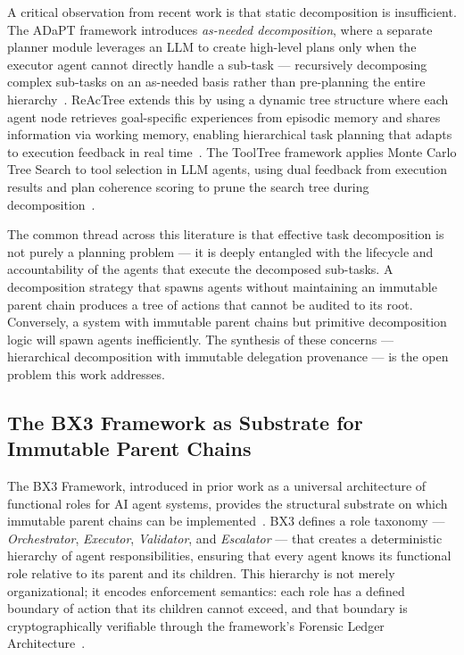 A critical observation from recent work is that static decomposition is insufficient. The ADaPT framework introduces \textit{as-needed decomposition}, where a separate planner module leverages an LLM to create high-level plans only when the executor agent cannot directly handle a sub-task — recursively decomposing complex sub-tasks on an as-needed basis rather than pre-planning the entire hierarchy~\cite{adapt-decomposition}. ReAcTree extends this by using a dynamic tree structure where each agent node retrieves goal-specific experiences from episodic memory and shares information via working memory, enabling hierarchical task planning that adapts to execution feedback in real time~\cite{reactree}. The ToolTree framework applies Monte Carlo Tree Search to tool selection in LLM agents, using dual feedback from execution results and plan coherence scoring to prune the search tree during decomposition~\cite{tool-tree}.

The common thread across this literature is that effective task decomposition is not purely a planning problem — it is deeply entangled with the lifecycle and accountability of the agents that execute the decomposed sub-tasks. A decomposition strategy that spawns agents without maintaining an immutable parent chain produces a tree of actions that cannot be audited to its root. Conversely, a system with immutable parent chains but primitive decomposition logic will spawn agents inefficiently. The synthesis of these concerns — hierarchical decomposition with immutable delegation provenance — is the open problem this work addresses.

\subsection{The BX3 Framework as Substrate for Immutable Parent Chains}

The BX3 Framework, introduced in prior work as a universal architecture of functional roles for AI agent systems, provides the structural substrate on which immutable parent chains can be implemented~\cite{bx3-framework}. BX3 defines a role taxonomy — \textit{Orchestrator}, \textit{Executor}, \textit{Validator}, and \textit{Escalator} — that creates a deterministic hierarchy of agent responsibilities, ensuring that every agent knows its functional role relative to its parent and its children. This hierarchy is not merely organizational; it encodes enforcement semantics: each role has a defined boundary of action that its children cannot exceed, and that boundary is cryptographically verifiable through the framework's Forensic Ledger Architecture~\cite{forensic-ledger}.

